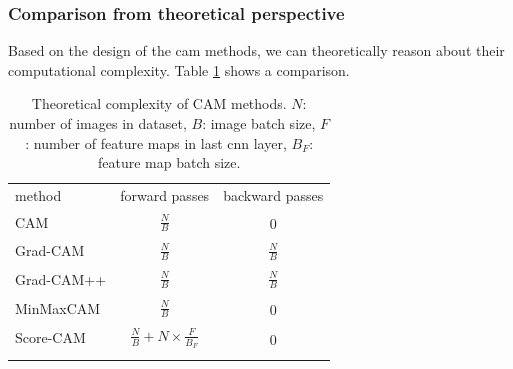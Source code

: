 \subsubsection{Comparison from theoretical perspective}
Based on the design of the \acrshort{cam} methods, we can theoretically reason about their computational complexity. Table \ref{tab:complexity_theoretical} shows a comparison.
\begin{table}[ht]
\centering
\begin{tabular}{lcc}
  \toprule
  method & forward passes & backward passes\\
  \cmidrule(lr){1-3}
  \addlinespace[0.5em]
  CAM & $\begin{aligned} \frac{N}{B} \end{aligned}$ & $\begin{aligned}0\end{aligned}$\\
  \addlinespace[0.5em]
  Grad-CAM   & $\begin{aligned} \frac{N}{B} \end{aligned}$ & $\begin{aligned} \frac{N}{B}\end{aligned}$\\
  \addlinespace[0.5em]
  Grad-CAM++ & $\begin{aligned} \frac{N}{B} \end{aligned}$ & $\begin{aligned} \frac{N}{B}\end{aligned}$\\
  \addlinespace[0.5em]
  MinMaxCAM & $\begin{aligned} \frac{N}{B} \end{aligned}$ & $\begin{aligned}0\end{aligned}$\\
  \addlinespace[0.5em]
  Score-CAM &  $\begin{aligned} \frac{N}{B} + N \times \frac{F}{B_F} \end{aligned}$ & $\begin{aligned}0\end{aligned}$\\
  \addlinespace[0.5em]
  \bottomrule 
\end{tabular}
\caption[Theoretical complexity of CAM methods]{Theoretical complexity of CAM methods. $N$: number of images in dataset, $B$: image batch size, $F$: number of feature maps in last \acrshort{cnn} layer, $B_F$: feature map batch size.}
\label{tab:complexity_theoretical}
\end{table}

